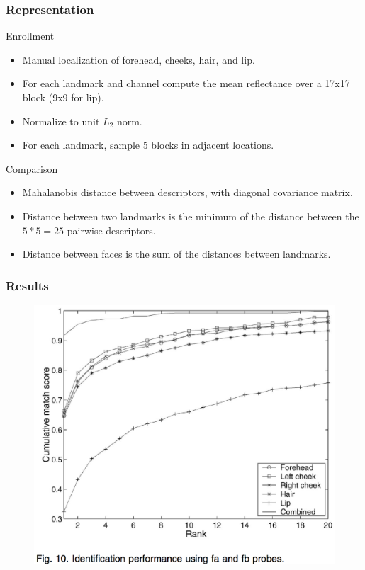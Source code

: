 \documentclass{beamer}
\begin{document}
\begin{frame}
\frametitle{Representation}
\begin{block}{Enrollment}
\begin{itemize}
\item Manual localization of forehead, cheeks, hair, and lip.
\item For each landmark and channel compute the mean reflectance over a 17x17 block (9x9 for lip).
\item Normalize to unit $L_2$ norm.
\item For each landmark, sample 5 blocks in adjacent locations.
\end{itemize}
\end{block}
\pause
\begin{block}{Comparison}
\begin{itemize}
\item Mahalanobis distance between descriptors, with diagonal covariance matrix.
\item Distance between two landmarks is the minimum of the distance between the $5*5=25$ pairwise descriptors.
\item Distance between faces is the sum of the distances between landmarks.
\end{itemize}
\end{block}
\end{frame}

\begin{frame}
\frametitle{Results}
\begin{figure}
\includegraphics[height=0.8\textheight]{landmarkresults}
\end{figure}
\end{frame}
\end{document}
